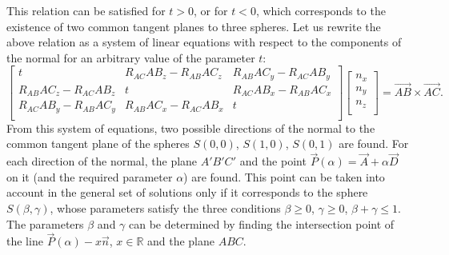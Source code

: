 \documentclass[
11pt,%
tightenlines,%
twoside,%
onecolumn,%
nofloats,%
nobibnotes,%
nofootinbib,%
superscriptaddress,%
noshowpacs,%
centertags]%
{revtex4-2}
\begin{document}
This relation can be satisfied for $t > 0$, or for  $t < 0$, which
corresponds to the existence of two common tangent planes to three
spheres.
Let us rewrite the above relation as a system  of linear equations
with respect to the components of the normal for an arbitrary value
of the parameter $t$:
\begin{equation}
\left[ { \begin{array}{ccc}
             t & R_{AC} AB_z - R_{AB} AC_z & R_{AB} AC_y - R_{AC} AB_y \\
             R_{AB} AC_z - R_{AC} AB_z & t & R_{AC} AB_x - R_{AB} AC_x \\
             R_{AC} AB_y - R_{AB} AC_y & R_{AB} AC_x - R_{AC} AB_x & t \\
         \end{array} } \right]
\left[ { \begin{array}{c}
            n_x \\
            n_y \\
            n_z \\
         \end{array} } \right]
= \vec{AB} \times \vec{AC}.
\end{equation}
From this system of equations, two possible directions of the normal
to the common tangent plane of the spheres $S(0,0)$, $S(1,0)$, $S(0,
1)$ are found.
For each direction of the normal, the plane $A'B'C'$ and the point $\vec{P}(\alpha) = \vec{A} + \alpha \vec{D}$ on it (and the required parameter $\alpha$) are found.
This point can be taken into account in the general set of solutions only if it corresponds to the sphere $S(\beta, \gamma)$, whose parameters satisfy the three conditions $\beta \ge 0$, $\gamma \ge 0$, $ \beta + \gamma \le 1$.
The parameters $\beta$ and $\gamma$ can be determined by finding the intersection point of the line $\vec{P}(\alpha) - x \vec{n}$, $x \in \mathbb{R}$ and the plane $ABC$.
\end{document}
